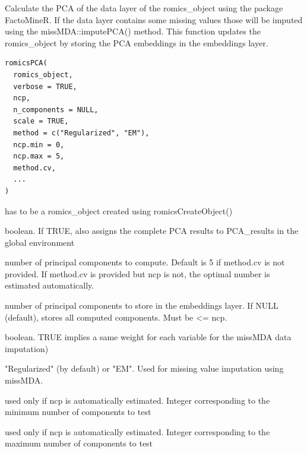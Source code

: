 \documentclass[a4paper]{book}
\begin{document}
%
\begin{Description}
Calculate the PCA of the data layer of the romics\_object using the package FactoMineR.
If the data layer contains some missing values those will be imputed using the missMDA::imputePCA() method.
This function updates the romics\_object by storing the PCA embeddings in the embeddings layer.
\end{Description}
%
\begin{Usage}
\begin{verbatim}
romicsPCA(
  romics_object,
  verbose = TRUE,
  ncp,
  n_components = NULL,
  scale = TRUE,
  method = c("Regularized", "EM"),
  ncp.min = 0,
  ncp.max = 5,
  method.cv,
  ...
)
\end{verbatim}
\end{Usage}
%
\begin{Arguments}
\begin{ldescription}
\item[\code{romics\_object}] has to be a romics\_object created using romicsCreateObject()

\item[\code{verbose}] boolean. If TRUE, also assigns the complete PCA results to PCA\_results in the global environment

\item[\code{ncp}] number of principal components to compute. Default is 5 if method.cv is not provided.
If method.cv is provided but ncp is not, the optimal number is estimated automatically.

\item[\code{n\_components}] number of principal components to store in the embeddings layer. If NULL (default),
stores all computed components. Must be <= ncp.

\item[\code{scale}] boolean. TRUE implies a same weight for each variable for the missMDA data imputation)

\item[\code{method}] "Regularized" (by default) or "EM". Used for missing value imputation using missMDA.

\item[\code{ncp.min}] used only if ncp is automatically estimated. Integer corresponding to the minimum number of components to test

\item[\code{ncp.max}] used only if ncp is automatically estimated. Integer corresponding to the maximum number of components to test


\end{ldescription}
\end{Arguments}
\end{document}
